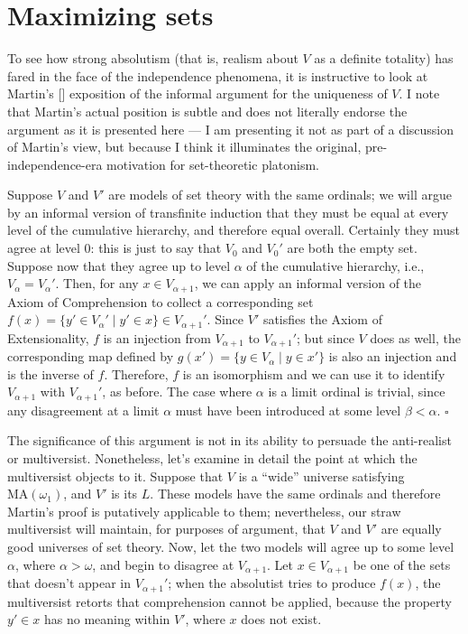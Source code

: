 \documentclass[letterpaper,12pt]{article}
\begin{document}
\section{Maximizing sets}
\label{maximizingsets}
To see how strong absolutism (that is, realism about $V$ as a definite totality) has fared in the face of the independence phenomena, it is instructive to look at Martin's [\citeyear{martin2012completeness}] exposition of the informal argument for the uniqueness of $V$. I note that Martin's actual position is subtle and does not literally endorse the argument as it is presented here --- I am presenting it not as part of a discussion of Martin's view, but because I think it illuminates the original, pre-independence-era motivation for set-theoretic platonism.

Suppose $V$ and $V'$ are models of set theory with the same ordinals; we will argue by an informal version of transfinite induction that they must be equal at every level of the cumulative hierarchy, and therefore equal overall. Certainly they must agree at level $0$: this is just to say that $V_0$ and $V_0'$ are both the empty set. Suppose now that they agree up to level $\alpha$ of the cumulative hierarchy, i.e., $V_\alpha = V_\alpha'$. Then, for any $x \in V_{\alpha+1}$, we can apply an informal version of the Axiom of Comprehension to collect a corresponding set $f(x) = \{y' \in V_\alpha' \mid y' \in x\} \in V_{\alpha+1}'$. Since $V'$ satisfies the Axiom of Extensionality, $f$ is an injection from $V_{\alpha + 1}$ to $V_{\alpha+1}'$; but since $V$ does as well, the corresponding map defined by $g(x') = \{y \in V_\alpha \mid y \in x'\}$ is also an injection and is the inverse of $f$. Therefore, $f$ is an isomorphism and we can use it to identify $V_{\alpha+1}$ with $V_{\alpha+1}'$, as before. The case where $\alpha$ is a limit ordinal is trivial, since any disagreement at a limit $\alpha$ must have been introduced at some level $\beta < \alpha$. $\square$

The significance of this argument is not in its ability to persuade the anti-realist or multiversist. Nonetheless, let's examine in detail the point at which the multiversist objects to it. Suppose that $V$ is a ``wide'' universe satisfying $\mathrm{MA}(\omega_1)$, and $V'$ is its $L$. These models have the same ordinals and therefore Martin's proof is putatively applicable to them; nevertheless, our straw multiversist will maintain, for purposes of argument, that $V$ and $V'$ are equally good universes of set theory. Now, let  the two models will agree up to some level $\alpha$, where $\alpha > \omega$, and begin to disagree at $V_{\alpha + 1}$. Let $x \in V_{\alpha+1}$ be one of the sets that doesn't appear in $V_{\alpha+1}'$; when the absolutist tries to produce $f(x)$, the multiversist retorts that comprehension cannot be applied, because the property $y' \in x$ has no meaning within $V'$, where $x$ does not exist.
\end{document}
